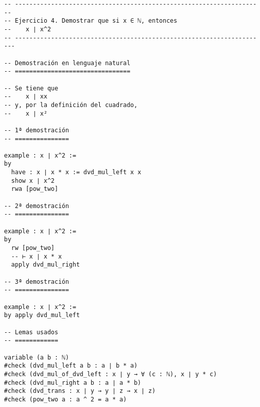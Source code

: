 \begin{verbatim}
-- ---------------------------------------------------------------------
-- Ejercicio 4. Demostrar que si x ∈ ℕ, entonces
--    x ∣ x^2
-- ----------------------------------------------------------------------

-- Demostración en lenguaje natural
-- ================================

-- Se tiene que
--    x ∣ xx
-- y, por la definición del cuadrado,
--    x ∣ x²

-- 1ª demostración
-- ===============

example : x ∣ x^2 :=
by
  have : x ∣ x * x := dvd_mul_left x x
  show x ∣ x^2
  rwa [pow_two]

-- 2ª demostración
-- ===============

example : x ∣ x^2 :=
by
  rw [pow_two]
  -- ⊢ x ∣ x * x
  apply dvd_mul_right

-- 3ª demostración
-- ===============

example : x ∣ x^2 :=
by apply dvd_mul_left

-- Lemas usados
-- ============

variable (a b : ℕ)
#check (dvd_mul_left a b : a ∣ b * a)
#check (dvd_mul_of_dvd_left : x ∣ y → ∀ (c : ℕ), x ∣ y * c)
#check (dvd_mul_right a b : a ∣ a * b)
#check (dvd_trans : x ∣ y → y ∣ z → x ∣ z)
#check (pow_two a : a ^ 2 = a * a)
\end{verbatim}

